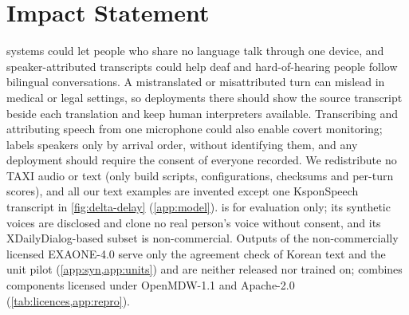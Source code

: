 \section*{Impact Statement}

\task systems could let people who share no language talk through one device, and speaker-attributed transcripts could help deaf and hard-of-hearing people follow bilingual conversations.
A mistranslated or misattributed turn can mislead in medical or legal settings, so deployments there should show the source transcript beside each translation and keep human interpreters available.
Transcribing and attributing speech from one microphone could also enable covert monitoring; \model labels speakers only by arrival order, without identifying them, and any deployment should require the consent of everyone recorded.
We redistribute no TAXI audio or text (only build scripts, configurations, checksums and per-turn scores), and all our text examples are invented except one KsponSpeech \citep{bang2020ksponspeech} transcript in \cref{fig:delta-delay} (\cref{app:model}).
\bench is for evaluation only; its synthetic voices are disclosed and clone no real person's voice without consent, and its XDailyDialog-based subset is non-commercial.
Outputs of the non-commercially licensed EXAONE-4.0 \citep{lgai2025exaone4} serve only the agreement check of Korean \syn text and the unit pilot (\cref{app:syn,app:units}) and are neither released nor trained on; \model combines components licensed under OpenMDW-1.1 and Apache-2.0 (\cref{tab:licences,app:repro}).
